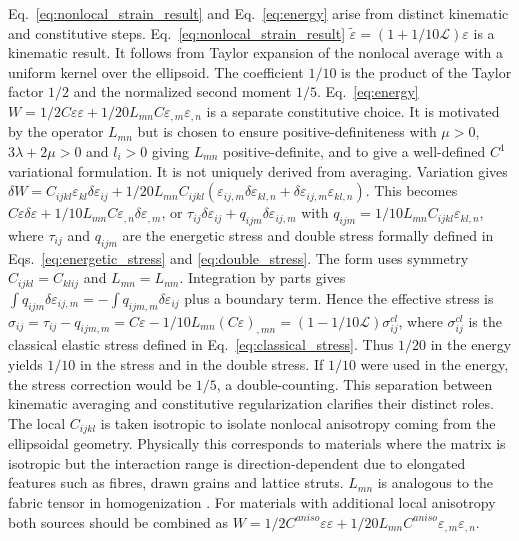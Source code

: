 \documentclass[final,3p,times,fleqn]{elsarticle}
\begin{document}
Eq.~\eqref{eq:nonlocal_strain_result} and Eq.~\eqref{eq:energy} arise from distinct kinematic and constitutive steps. Eq.~\eqref{eq:nonlocal_strain_result} $\tilde{\varepsilon}=(1+1/10\mathcal{L})\varepsilon$ is a kinematic result. It follows from Taylor expansion of the nonlocal average with a uniform kernel over the ellipsoid. The coefficient $1/10$ is the product of the Taylor factor $1/2$ and the normalized second moment $1/5$. Eq.~\eqref{eq:energy} $W=1/2C\varepsilon\varepsilon+1/20 L_{mn}C\varepsilon_{,m}\varepsilon_{,n}$ is a separate constitutive choice. It is motivated by the operator $L_{mn}$ but is chosen to ensure positive-definiteness with $\mu>0$, $3\lambda+2\mu>0$ and $l_i>0$ giving $L_{mn}$ positive-definite, and to give a well-defined $C^1$ variational formulation. It is not uniquely derived from averaging. Variation gives $\delta W = C_{ijkl}\varepsilon_{kl}\delta\varepsilon_{ij}+1/20 L_{mn}C_{ijkl}(\varepsilon_{ij,m}\delta\varepsilon_{kl,n}+\delta\varepsilon_{ij,m}\varepsilon_{kl,n})$. This becomes $C\varepsilon\delta\varepsilon+1/10 L_{mn}C\varepsilon_{,n}\delta\varepsilon_{,m}$, or $\tau_{ij}\delta\varepsilon_{ij}+q_{ijm}\delta\varepsilon_{ij,m}$ with $q_{ijm}=1/10 L_{mn}C_{ijkl}\varepsilon_{kl,n}$, where $\tau_{ij}$ and $q_{ijm}$ are the energetic stress and double stress formally defined in Eqs.~\eqref{eq:energetic_stress} and \eqref{eq:double_stress}. The form uses symmetry $C_{ijkl}=C_{klij}$ and $L_{mn}=L_{nm}$. Integration by parts gives $\int q_{ijm}\delta\varepsilon_{ij,m}=-\int q_{ijm,m}\delta\varepsilon_{ij}$ plus a boundary term. Hence the effective stress is $\sigma_{ij}=\tau_{ij}-q_{ijm,m}=C\varepsilon-1/10 L_{mn}(C\varepsilon)_{,mn}=(1-1/10\mathcal{L})\sigma^{cl}_{ij}$, where $\sigma^{cl}_{ij}$ is the classical elastic stress defined in Eq.~\eqref{eq:classical_stress}. Thus $1/20$ in the energy yields $1/10$ in the stress and in the double stress. If $1/10$ were used in the energy, the stress correction would be $1/5$, a double-counting. This separation between kinematic averaging and constitutive regularization clarifies their distinct roles. The local $C_{ijkl}$ is taken isotropic to isolate nonlocal anisotropy coming from the ellipsoidal geometry. Physically this corresponds to materials where the matrix is isotropic but the interaction range is direction-dependent due to elongated features such as fibres, drawn grains and lattice struts. $L_{mn}$ is analogous to the fabric tensor in homogenization \cite{LazarPo2015,Polizzotto2018,Auffray2019}. For materials with additional local anisotropy both sources should be combined as $W=1/2 C^{aniso}\varepsilon\varepsilon+1/20 L_{mn}C^{aniso}\varepsilon_{,m}\varepsilon_{,n}$.
\end{document}
